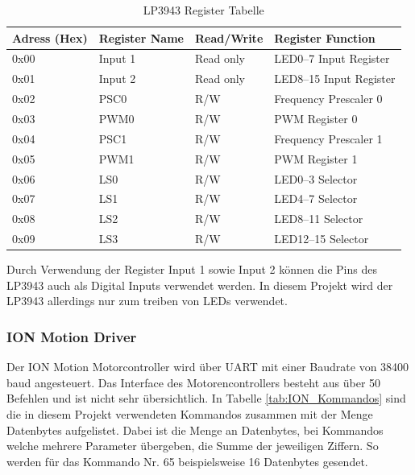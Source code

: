 \begin{table}[H]
	\centering
	\caption{LP3943 Register Tabelle \protect\cite{LP3943}}
	\begin{tabular}{|l|l|l|l|}
		\hline
		\textbf{Adress (Hex)} & \textbf{Register Name} & \textbf{Read/Write} & \textbf{Register Function} \\
		\hline
		0x00  & Input 1 & Read only & LED0–7 Input Register \\
		\hline
		0x01  & Input 2 & Read only & LED8–15 Input Register \\
		\hline
		0x02  & PSC0  & R/W   & Frequency Prescaler 0 \\
		\hline
		0x03  & PWM0  & R/W   & PWM Register 0 \\
		\hline
		0x04  & PSC1  & R/W   & Frequency Prescaler 1 \\
		\hline
		0x05  & PWM1  & R/W   & PWM Register 1 \\
		\hline
		0x06  & LS0   & R/W   & LED0–3 Selector \\
		\hline
		0x07  & LS1   & R/W   & LED4–7 Selector \\
		\hline
		0x08  & LS2   & R/W   & LED8–11 Selector \\
		\hline
		0x09  & LS3   & R/W   & LED12–15 Selector \\
		\hline
	\end{tabular}%
	\label{tab:LP3943_Register}%
\end{table}%

Durch Verwendung der Register Input 1 sowie Input 2 können die Pins des LP3943 auch als Digital Inputs verwendet werden. In diesem Projekt wird der LP3943 allerdings nur zum treiben von LEDs verwendet.

\subsubsection{ION Motion Driver}
Der ION Motion Motorcontroller wird über UART mit einer Baudrate von 38400 baud angesteuert. Das Interface des Motorencontrollers besteht aus über 50 Befehlen und ist nicht sehr übersichtlich. In Tabelle \ref{tab:ION_Kommandos} sind die in diesem Projekt verwendeten Kommandos zusammen mit der Menge Datenbytes aufgelistet. Dabei ist die Menge an Datenbytes, bei Kommandos welche mehrere Parameter übergeben, die Summe der jeweiligen Ziffern. So werden für das Kommando Nr. 65 beispielsweise 16 Datenbytes gesendet.

